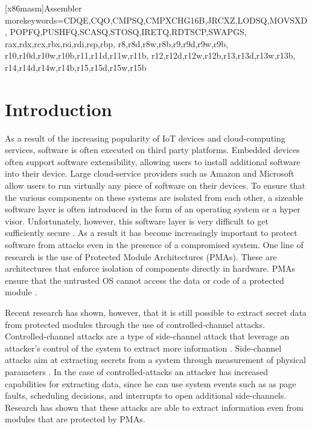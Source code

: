 
   [x86masm]{Assembler} %
   {morekeywords={CDQE,CQO,CMPSQ,CMPXCHG16B,JRCXZ,LODSQ,MOVSXD, %
                  POPFQ,PUSHFQ,SCASQ,STOSQ,IRETQ,RDTSCP,SWAPGS, %
                  rax,rdx,rcx,rbx,rsi,rdi,rsp,rbp, %
                  r8,r8d,r8w,r8b,r9,r9d,r9w,r9b, %
                  r10,r10d,r10w,r10b,r11,r11d,r11w,r11b, %
                  r12,r12d,r12w,r12b,r13,r13d,r13w,r13b, %
                  r14,r14d,r14w,r14b,r15,r15d,r15w,r15b}} %


\chapter{Introduction}
\label{cha:introduction}
As a result of the increasing popularity of IoT devices and cloud-computing services, software is often executed on third party platforms. 
Embedded devices often support software extensibility, allowing users to install additional software into their device. 
Large cloud-service providers such as Amazon and Microsoft allow users to run virtually any piece of software on their devices. 
To ensure that the various components on these systems are isolated from each other, a sizeable software layer is often introduced in the form of an operating system or 
a hyper visor.
Unfortunately, however, this software layer is very difficult to get sufficiently secure \cite{psma}.
As a result it has become increasingly important to protect software from attacks even in the presence of a compromised system. 
One line of research is the use of Protected Module Architectures (PMAs). 
These are architectures that enforce isolation of components directly in hardware.
PMAs ensure that the untrusted OS cannot access the data or code of a protected module \cite{Nemesis}. 

Recent research has shown, however, that it is still possible to extract secret data from protected modules through the use of controlled-channel attacks. 
Controlled-channel attacks are a type of side-channel attack that leverage an attacker's control of the system to extract more information \cite{Xu}.	
Side-channel attacks aim at extracting secrets from a system through measurement of physical parameters \cite{side-channel}. 
In the case of controlled-attacks an attacker has increased capabilities for extracting data, since he can use system events such as as page faults, scheduling decisions, and interrupts to open additional side-channels. 
Research has shown that these attacks are able to extract information even from modules that are protected by PMAs. 

